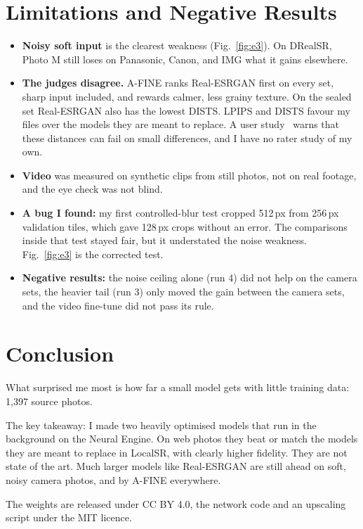 \documentclass[conference]{IEEEtran}
\begin{document}
\section{Limitations and Negative Results}

\begin{itemize}
\item \textbf{Noisy soft input} is the clearest weakness (Fig.~\ref{fig:e3}). On DRealSR, Photo M still loses on
  Panasonic, Canon, and IMG what it gains elsewhere.
\item \textbf{The judges disagree.} A-FINE ranks Real-ESRGAN first on every set, sharp input included, and rewards
  calmer, less grainy texture. On the sealed set Real-ESRGAN also has the lowest DISTS. LPIPS and DISTS favour my
  files over the models they are meant to replace. A user study~\cite{su} warns that these distances can fail on small
  differences, and I have no rater study of my own.
\item \textbf{Video} was measured on synthetic clips from still photos, not on real footage, and the eye check was not
  blind.
\item \textbf{A bug I found:} my first controlled-blur test cropped 512\,px from 256\,px validation tiles, which gave
  128\,px crops without an error. The comparisons inside that test stayed fair, but it understated the noise weakness.
  Fig.~\ref{fig:e3} is the corrected test.
\item \textbf{Negative results:} the noise ceiling alone (run 4) did not help on the camera sets, the heavier tail (run
  3) only moved the gain between the camera sets, and the video fine-tune did not pass its rule.
\end{itemize}

\section{Conclusion}

What surprised me most is how far a small model gets with little training data: 1{,}397 source photos.

The key takeaway: I made two heavily optimised models that run in the background on the Neural Engine. On web
photos they beat or match the models they are meant to replace in LocalSR, with clearly higher fidelity. They
are not state of the art. Much larger models like Real-ESRGAN are still ahead on soft, noisy camera photos, and
by A-FINE everywhere.

The weights are released under CC BY 4.0, the network code and an upscaling script under the MIT licence.
\end{document}
